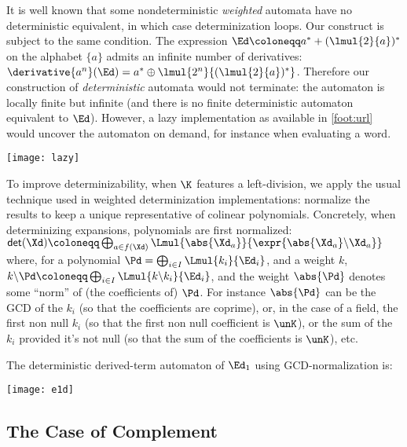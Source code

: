 \documentclass[a4paper,USenglish]{lipics}
\begin{document}
It is well known that some nondeterministic \emph{weighted} automata have no
deterministic equivalent, in which case determinization loops.  Our
construct is subject to the same condition.  The expression
$\Ed \coloneqq a^*+(\lmul{2}{a})^*$ on the alphabet $\{a\}$ admits an
infinite number of derivatives:
$\derivative{a^n}(\Ed) = a^* \oplus \lmul{2^n}{(\lmul{2}{a})^*}$.  Therefore
our construction of \emph{deterministic} automata would not terminate: the
automaton is locally finite but infinite (and there is no finite
deterministic automaton equivalent to $\Ed$).  However, a lazy
implementation as available in \vcsn{}\cref{foot:url} would uncover the
automaton on demand, for instance when evaluating a word.

\smallskip
\centerline{\texttt{[image: lazy]}}

To improve determinizability, when $\K$ features a left-division, we apply
the usual technique used in weighted determinization implementations:
normalize the results to keep a unique representative of colinear
polynomials.  Concretely, when determinizing expansions, polynomials are
first normalized:
\begin{math}
  \mathsf{det}(\Xd) \coloneqq \bigoplus_{a\in f(\Xd)} \Lmul{\abs{\Xd_a}}{\expr{\abs{\Xd_a} \backslash \Xd_a}}
\end{math}
where, for a polynomial $\Pd = \bigoplus_{i\in I} \Lmul{k_i}{\Ed_i}$, and a
weight $k$,
$k \backslash \Pd \coloneqq \bigoplus_{i\in I} \Lmul{k \backslash
  k_i}{\Ed_i}$,
and the weight $\abs{\Pd}$ denotes some ``norm'' of (the coefficients of)
$\Pd$.  For instance $\abs{\Pd}$ can be the GCD of the $k_i$ (so that the
coefficients are coprime), or, in the case of a field, the first non null
$k_i$ (so that the first non null coefficient is $\unK$), or the sum of the
$k_i$ provided it's not null (so that the sum of the coefficients is
$\unK$), etc.

\begin{Example}
  \label{ex:e1:det}
  The deterministic derived-term automaton of $\Ed_1$ using
  GCD-normalization is:
  \\[-1ex]
  \centerline{\texttt{[image: e1d]}}
\end{Example}
\vspace{-10mm}

\subsection{The Case of Complement}
\label{sec:compl}
\end{document}
